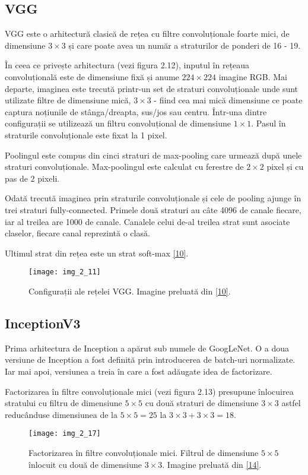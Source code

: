 \subsection{VGG}

VGG este o arhitectură clasică de rețea cu filtre convoluționale foarte mici, de dimensiune $3 \times 3$ și care poate avea un număr a straturilor de ponderi de 16 - 19. 

În ceea ce privește arhitectura (vezi figura 2.12), inputul în rețeaua convoluțională este de dimensiune fixă și anume $224 \times 224$ imagine RGB. Mai departe, imaginea este trecută printr-un set de straturi convoluționale unde sunt utilizate filtre de dimensiune mică, $3 \times 3$ - fiind cea mai mică dimensiune ce poate captura noțiunile de stânga/dreapta, sus/jos sau centru. Într-una dintre configurații se utilizează un filtru convoluțional de dimensiune $1 \times 1$. Pasul în straturile convoluționale este fixat la 1 pixel.

Poolingul este compus din cinci straturi de max-pooling care urmează după unele straturi convoluționale. Max-poolingul este calculat cu ferestre de $2\times2$ pixel și cu pas de 2 pixeli.

Odată trecută imaginea prin straturile convoluționale și cele de pooling ajunge în trei straturi fully-connected. Primele două straturi au câte 4096 de canale fiecare, iar al treilea are 1000 de canale. Canalele celui de-al treilea strat sunt asociate claselor, fiecare canal reprezintă o clasă.

Ultimul strat din rețea este un strat soft-max \hyperlink{SimonyanKarenZissermanAndrew}{[10]}.

\begin{figure}[!h]
	\centering
	\texttt{[image: img\_2\_11]}
	\caption[Configurații VGG]{Configurații ale rețelei VGG. Imagine preluată din \hyperlink{SimonyanKarenZissermanAndrew}{[10]}.}
\end{figure}   

\subsection{InceptionV3}
Prima arhitectura de Inception a apărut sub numele de GoogLeNet. O a doua versiune de Inception a fost definită prin introducerea de batch-uri normalizate. Iar mai apoi, versiunea a treia în care a fost adăugate idea de factorizare.

Factorizarea în filtre convoluționale mici (vezi figura 2.13) presupune înlocuirea stratului cu filtru de dimensiune $5 \times 5$ cu două straturi de dimensiune $3 \times 3$ astfel reducânduse dimensiunea de la $5 \times 5 = 25$ la $3 \times 3 + 3 \times 3 = 18$.
\begin{figure}[!h]
	\centering
	\texttt{[image: img\_2\_17]}
	\caption[Factorizarea în filtre convoluționale mici]{Factorizarea în filtre convoluționale mici. Filtrul de dimensiune $5 \times 5$ înlocuit cu două de dimensiune $3 \times 3$. Imagine preluată din \hyperlink{guideinceptionv3}{[14]}.}
\end{figure}   


